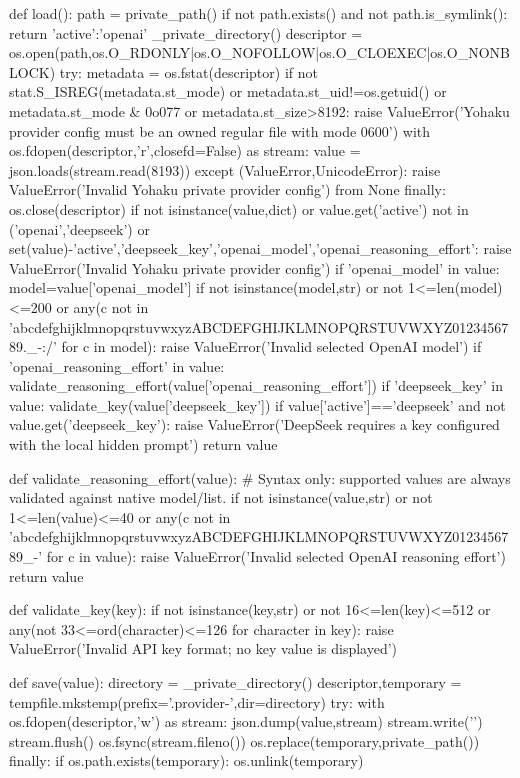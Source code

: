 def load():
    path = private_path()
    if not path.exists() and not path.is_symlink():
        return {'active':'openai'}
    _private_directory()
    descriptor = os.open(path,os.O_RDONLY|os.O_NOFOLLOW|os.O_CLOEXEC|os.O_NONBLOCK)
    try:
        metadata = os.fstat(descriptor)
        if not stat.S_ISREG(metadata.st_mode) or metadata.st_uid!=os.getuid() or metadata.st_mode & 0o077 or metadata.st_size>8192:
            raise ValueError('Yohaku provider config must be an owned regular file with mode 0600')
        with os.fdopen(descriptor,'r',closefd=False) as stream:
            value = json.loads(stream.read(8193))
    except (ValueError,UnicodeError):
        raise ValueError('Invalid Yohaku private provider config') from None
    finally:
        os.close(descriptor)
    if not isinstance(value,dict) or value.get('active') not in ('openai','deepseek') or set(value)-{'active','deepseek_key','openai_model','openai_reasoning_effort'}:
        raise ValueError('Invalid Yohaku private provider config')
    if 'openai_model' in value:
        model=value['openai_model']
        if not isinstance(model,str) or not 1<=len(model)<=200 or any(c not in 'abcdefghijklmnopqrstuvwxyzABCDEFGHIJKLMNOPQRSTUVWXYZ0123456789._-:/' for c in model):
            raise ValueError('Invalid selected OpenAI model')
    if 'openai_reasoning_effort' in value:
        validate_reasoning_effort(value['openai_reasoning_effort'])
    if 'deepseek_key' in value:
        validate_key(value['deepseek_key'])
    if value['active']=='deepseek' and not value.get('deepseek_key'):
        raise ValueError('DeepSeek requires a key configured with the local hidden prompt')
    return value


def validate_reasoning_effort(value):
    # Syntax only: supported values are always validated against native model/list.
    if not isinstance(value,str) or not 1<=len(value)<=40 or any(c not in 'abcdefghijklmnopqrstuvwxyzABCDEFGHIJKLMNOPQRSTUVWXYZ0123456789_-' for c in value):
        raise ValueError('Invalid selected OpenAI reasoning effort')
    return value


def validate_key(key):
    if not isinstance(key,str) or not 16<=len(key)<=512 or any(not 33<=ord(character)<=126 for character in key):
        raise ValueError('Invalid API key format; no key value is displayed')


def save(value):
    directory = _private_directory()
    descriptor,temporary = tempfile.mkstemp(prefix='.provider-',dir=directory)
    try:
        with os.fdopen(descriptor,'w') as stream:
            json.dump(value,stream)
            stream.write('\n')
            stream.flush()
            os.fsync(stream.fileno())
        os.replace(temporary,private_path())
    finally:
        if os.path.exists(temporary):
            os.unlink(temporary)


